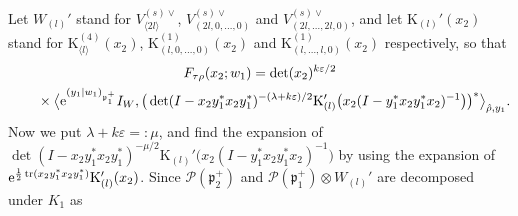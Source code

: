 \documentclass[pdftex]{sigma}
\numberwithin{equation}{section}
\newcommand{\fp}{\mathfrak{p}}
\newcommand{\cP}{\mathcal{P}}
\newcommand{\rK}{\mathrm{K}}
\newcommand{\tr}{\operatorname{tr}}
\begin{document}
Let $W_{(l)}'$ stand for $V_{\langle 2l\rangle}^{(s)\vee}$, $V_{(2l,0,\ldots,0)}^{(s)\vee}$ and $V_{(2l,\ldots,2l,0)}^{(s)\vee}$,
and let $\rK_{(l)}'(x_2)$ stand for $\rK_{\langle l\rangle}^{(4)}(x_2)$, \linebreak $\rK_{(l,0,\ldots,0)}^{(1)}(x_2)$ and
$\rK_{(l,\ldots,l,0)}^{(1)}(x_2)$ respectively, so that
\begin{gather*}
 F_{\tau\rho}(x_2;w_1)=\det(x_2)^{k\varepsilon/2}\\
 \qquad{}\times\big\langle {\rm e}^{(y_1|w_1)_{\fp^+_1}}I_W,
\big(\det(I-x_2y_1^*x_2y_1^*)^{-(\lambda+k\varepsilon)/2}\rK_{(l)}'\big(x_2(I-y_1^*x_2y_1^*x_2)^{-1}\big)\big)^*\big\rangle_{\hat{\rho},y_1}.
\end{gather*}
Now we put $\lambda+k\varepsilon=:\mu$, and find the expansion of $\det(I-x_2y_1^*x_2y_1^*)^{-\mu/2}\rK_{(l)}'\big(x_2(I-y_1^*x_2y_1^*x_2)^{-1}\big)$
by using the expansion of ${\rm e}^{\frac{1}{2}\tr(x_2y_1^*x_2y_1^*)}\rK_{(l)}'(x_2)$.
Since $\cP(\fp^+_2)$ and $\cP(\fp^+_1)\otimes W_{(l)}'$ are decomposed under $K_1$ as
\end{document}
